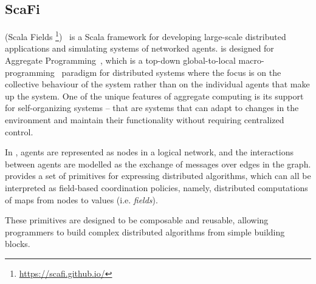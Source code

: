 \subsection{ScaFi}\label{coordination2023:scafi}

\scafi{} (Scala Fields \footnote{\url{https://scafi.github.io/}})~\cite{Casadei2022} 
 is a Scala framework for developing large-scale 
 distributed applications and simulating systems of networked agents.
%
\scafi{} is designed for Aggregate Programming~\cite{Beal2015}, 
 which is a top-down global-to-local 
 macro-programming~\cite{Casadei2023} paradigm for distributed systems 
 where the focus is on the collective behaviour of the system 
 rather than on the individual agents that make up the system.
%
One of the unique features of aggregate computing 
 is its support for self-organizing systems -- that are systems 
 that can adapt to changes in the environment and 
 maintain their functionality without requiring centralized control.

In \scafi{}, agents are represented as nodes in a logical network, 
 and the interactions between agents are modelled 
 as the exchange of messages over edges in the graph.
%
\scafi{} provides a set of primitives for expressing distributed
algorithms, 
 which can all be interpreted as field-based coordination policies, namely, 
 distributed computations of maps from nodes to values (i.e. \emph{fields}).
 
  These primitives are designed to be composable and reusable, 
 allowing programmers to build complex distributed algorithms from simple building blocks.
%


